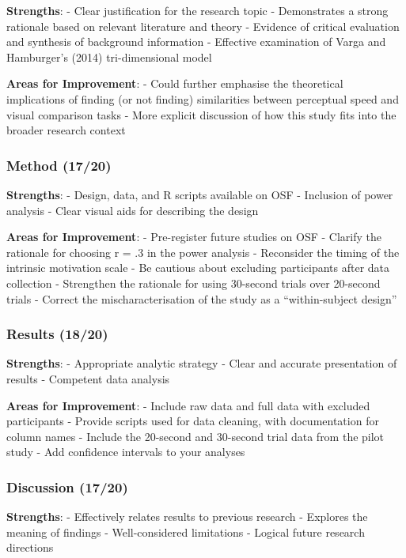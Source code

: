 \documentclass[
  single column]{article}
\begin{document}
\textbf{Strengths}: - Clear justification for the research topic -
Demonstrates a strong rationale based on relevant literature and theory
- Evidence of critical evaluation and synthesis of background
information - Effective examination of Varga and Hamburger's (2014)
tri-dimensional model

\textbf{Areas for Improvement}: - Could further emphasise the
theoretical implications of finding (or not finding) similarities
between perceptual speed and visual comparison tasks - More explicit
discussion of how this study fits into the broader research context

\subsubsection{Method (17/20)}\label{method-1720}

\textbf{Strengths}: - Design, data, and R scripts available on OSF -
Inclusion of power analysis - Clear visual aids for describing the
design

\textbf{Areas for Improvement}: - Pre-register future studies on OSF -
Clarify the rationale for choosing r = .3 in the power analysis -
Reconsider the timing of the intrinsic motivation scale - Be cautious
about excluding participants after data collection - Strengthen the
rationale for using 30-second trials over 20-second trials - Correct the
mischaracterisation of the study as a ``within-subject design''

\subsubsection{Results (18/20)}\label{results-1820}

\textbf{Strengths}: - Appropriate analytic strategy - Clear and accurate
presentation of results - Competent data analysis

\textbf{Areas for Improvement}: - Include raw data and full data with
excluded participants - Provide scripts used for data cleaning, with
documentation for column names - Include the 20-second and 30-second
trial data from the pilot study - Add confidence intervals to your
analyses

\subsubsection{Discussion (17/20)}\label{discussion-1720}

\textbf{Strengths}: - Effectively relates results to previous research -
Explores the meaning of findings - Well-considered limitations - Logical
future research directions
\end{document}
